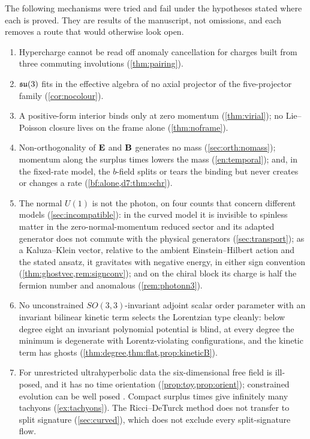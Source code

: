 The following mechanisms were tried and fail under the hypotheses stated where each is proved. They are results of the manuscript, not
omissions, and each removes a route that would otherwise look open.
\begin{enumerate}[label=(\arabic*),leftmargin=2.2em]
\item Hypercharge cannot be read off anomaly cancellation for charges built from three commuting involutions (\cref{thm:pairing}).
\item $\mathfrak{su}(3)$ fits in the effective algebra of no axial projector of the five-projector family (\cref{cor:nocolour}).
\item A positive-form interior binds only at zero momentum (\cref{thm:virial}); no Lie--Poisson closure lives on the frame alone
(\cref{thm:noframe}).
\item Non-orthogonality of $\mathbf E$ and $\mathbf B$ generates no mass (\cref{sec:orth:nomass}); momentum along the surplus times lowers the mass
(\cref{en:temporal}); and, in the fixed-rate model, the $b$-field splits or tears the binding but never creates or changes a rate (\cref{bf:alone,d7:thm:schr}).
\item The normal $U(1)$ is not the photon, on four counts that concern different models (\cref{sec:incompatible}): in the curved model it is
invisible to spinless matter in the zero-normal-momentum reduced sector and its adapted generator does not commute with the physical generators (\cref{sec:transport}); as a Kaluza--Klein
vector, relative to the ambient Einstein--Hilbert action and the stated ansatz, it gravitates with negative energy, in either sign convention
(\cref{thm:ghostvec,rem:signconv}); and on the chiral block its charge is half the fermion number and anomalous (\cref{rem:photonn3}).
\item No unconstrained $SO(3,3)$-invariant adjoint scalar order parameter with an invariant bilinear kinetic term selects the Lorentzian type
cleanly: below degree eight an invariant polynomial potential is blind, at every degree the minimum is degenerate with Lorentz-violating
configurations, and the kinetic term has ghosts (\cref{thm:degree,thm:flat,prop:kineticB}).
\item For unrestricted ultrahyperbolic data the six-dimensional free field is ill-posed, and it has no time orientation
(\cref{prop:toy,prop:orient}); constrained evolution can be well posed \cite{CraigWeinstein09}. Compact surplus times give infinitely many tachyons
(\cref{ex:tachyons}). The Ricci--DeTurck method does not transfer to split signature (\cref{sec:curved}), which does not exclude every
split-signature flow.
\end{enumerate}

